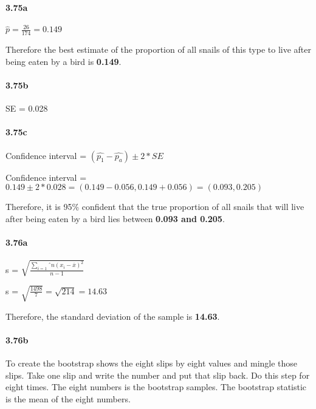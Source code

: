 \documentclass[
]{article}
\begin{document}
\hypertarget{a-9}{%
\paragraph{3.75a}\label{a-9}}

\(\hat{p} = \frac{26}{174} = 0.149\)

Therefore the best estimate of the proportion of all snails of this type
to live after being eaten by a bird is \textbf{0.149}.

\hypertarget{b-9}{%
\paragraph{3.75b}\label{b-9}}

SE = 0.028

\hypertarget{c-7}{%
\paragraph{3.75c}\label{c-7}}

Confidence interval = \((\hat{p_1} - \hat{p_a}) \pm 2 *SE\)

Confidence interval =
\(0.149\pm 2*0.028 =(0.149-0.056,0.149+0.056) = (0.093,0.205)\)

Therefore, it is 95\% confident that the true proportion of all snails
that will live after being eaten by a bird lies between \textbf{0.093
and 0.205}.

\hypertarget{a-10}{%
\paragraph{3.76a}\label{a-10}}

s = \(\sqrt{\frac{\sum_{i=1}ˆn (x_i-\overline{x})^2}{n-1}}\)

s = \(\sqrt{\frac{1498}{7}} = \sqrt{214} = 14.63\)

Therefore, the standard deviation of the sample is \textbf{14.63}.

\hypertarget{b-10}{%
\paragraph{3.76b}\label{b-10}}

To create the bootstrap shows the eight slips by eight values and mingle
those slips. Take one slip and write the number and put that slip back.
Do this step for eight times. The eight numbers is the bootstrap
samples. The bootstrap statistic is the mean of the eight numbers.
\end{document}
